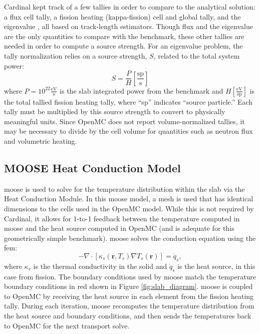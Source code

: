 \documentclass[letterpaper]{mc2023}
\begin{document}
Cardinal kept track of a few tallies in order to compare to the analytical solution: a flux cell tally, a fission heating (kappa-fission)
cell and global tally, and the eigenvalue \keff, all based on track-length estimators. Though flux and the eigenvalue are the only quantities
to compare with the benchmark, these other tallies are needed in order to compute a source strength. For an eigenvalue problem, the tally
normalization relies on a source strength, $S$, related to the total system power:
\begin{equation} \label{eq:source_strength}
   S = \frac{P}{H} \left[\frac{\textrm{sp}}{\textrm{s}} \right]
\end{equation}
where $P=10^{22} \frac{\textrm{eV}}{\textrm{s}}$ is the slab integrated power from the benchmark and $H \left[\frac{\textrm{eV}}{\textrm{sp}} \right]$
is the total tallied fission heating tally, where ``sp'' indicates ``source particle.'' Each tally must be multiplied by this source strength to
convert to physically meaningful units. Since OpenMC does not report volume-normalized tallies, it may be necessary to divide by the cell volume
for quantities such as neutron flux and volumetric heating.

\subsection{MOOSE Heat Conduction Model}
\gls{moose} is used to solve for the temperature distribution within the slab via the Heat Conduction Module. In this \gls{moose}
model, a mesh is used that has identical dimensions to the cells used in the OpenMC model. While this is not required by Cardinal,
it allows for 1-to-1 feedback between the temperature computed in \gls{moose} and the heat source computed in OpenMC (and is
adequate for this geometrically simple benchmark). \gls{moose} solves the conduction equation using the \gls{fem}:
\begin{equation}\label{eq:conduction}
    - \nabla \cdot [\kappa_{s}(\mathbf{r},T_{s}) \nabla T_{s}(\mathbf{r})] = \dot{q}_{s},
\end{equation}
where $\kappa_{s}$ is the thermal conductivity in the solid and $\dot{q}_{s}$ is the heat source, in this case from fission. The
boundary conditions used by \gls{moose} match the temperature boundary conditions in red shown in Figure \ref{fig:slab_diagram}.
\gls{moose} is coupled to OpenMC by receiving the heat source in each element from the fission heating tally. During each iteration,
\gls{moose} recomputes the temperature distribution from the heat source and boundary conditions, and then sends the temperatures
back to OpenMC for the next transport solve.
\end{document}
